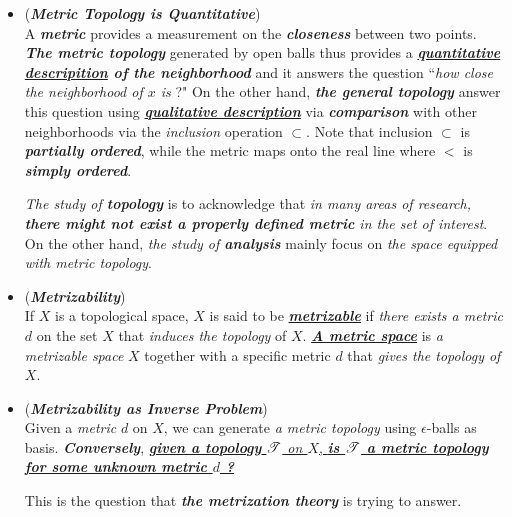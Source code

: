 \documentclass[11pt]{article}
\begin{document}
\begin{itemize}
\item \begin{remark} (\emph{\textbf{Metric Topology is Quantitative}})\\
A \emph{\textbf{metric}}  provides a  measurement on the \emph{\textbf{closeness}} between two points. \emph{\textbf{The metric topology}} generated by open balls thus provides a \emph{\textbf{\underline{quantitative descripition} of the neighborhood}} and it answers the question ``\emph{how close the neighborhood of $x$ is} ?" On the other hand, \emph{\textbf{the general topology}} answer this question using \emph{\textbf{\underline{qualitative description}}} via \emph{\textbf{comparison}} with other neighborhoods via the \emph{inclusion} operation $\subset$. Note that inclusion $\subset$ is \emph{\textbf{partially ordered}}, while the metric maps onto the real line where $<$ is \emph{\textbf{simply ordered}}.

\emph{The study of \textbf{topology}} is to acknowledge that \emph{in many areas of research, \textbf{there might not exist a properly defined metric} in the set of interest}. On the other hand, \emph{the study of \textbf{analysis}} mainly focus on \emph{the space equipped with metric topology}.
\end{remark}

\item \begin{definition} (\textbf{\emph{Metrizability}})\\
If $X$ is a topological space, $X$ is said to be \underline{\emph{\textbf{metrizable}}} if \emph{there exists a metric} $d$ on the set $X$ that \emph{induces the topology} of $X$. \underline{\emph{\textbf{A metric space}}} is \emph{a metrizable space} $X$ together with a specific metric $d$ that \emph{gives the topology of $X$}.
\end{definition}

\item \begin{remark} (\emph{\textbf{Metrizability as Inverse Problem}})\\
Given a \emph{metric} $d$ on $X$, we can generate \emph{a metric topology} using $\epsilon$-balls as basis. \emph{\textbf{Conversely}}, \underline{\emph{\textbf{given a topology} ${\mathscr T}$ on $X$}, \emph{\textbf{is ${\mathscr T}$ a metric topology for some unknown metric $d$ ?}}} 

This is the question that \emph{\textbf{the metrization theory}} is trying to answer.
\end{remark}


\end{itemize}
\end{document}
